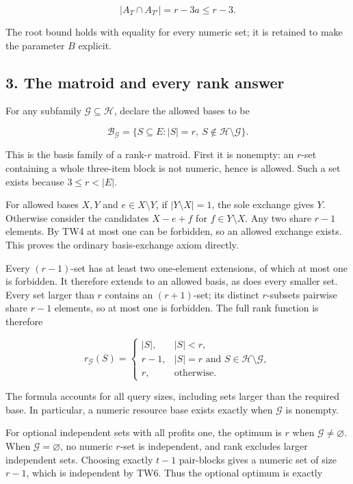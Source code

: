 \[
|A_T\cap A_{T'}|=r-3a\le r-3.
\tag{TW4}
\]

The root bound holds with equality for every numeric set; it is retained to make the parameter \(B\) explicit.

\hypertarget{af-e9b108715f-the-matroid-and-every-rank-answer}{%
\subsection{3. The matroid and every rank answer}\label{af-e9b108715f-the-matroid-and-every-rank-answer}}

For any subfamily \(\mathcal G\subseteq\mathcal H\), declare the allowed bases to be

\[
\mathcal B_{\mathcal G}
=\{S\subseteq E:|S|=r,\ S\notin\mathcal H\setminus\mathcal G\}.
\tag{TW5}
\]

This is the basis family of a rank-\(r\) matroid. First it is nonempty: an \(r\)-set containing a whole three-item block is not numeric, hence is allowed. Such a set exists because \(3\le r<|E|\).

For allowed bases \(X,Y\) and \(e\in X\setminus Y\), if \(|Y\setminus X|=1\), the sole exchange gives \(Y\). Otherwise consider the candidates \(X-e+f\) for \(f\in Y\setminus X\). Any two share \(r-1\) elements. By TW4 at most one can be forbidden, so an allowed exchange exists. This proves the ordinary basis-exchange axiom directly.

Every \((r-1)\)-set has at least two one-element extensions, of which at most one is forbidden. It therefore extends to an allowed basis, as does every smaller set. Every set larger than \(r\) contains an \((r+1)\)-set; its distinct \(r\)-subsets pairwise share \(r-1\) elements, so at most one is forbidden. The full rank function is therefore

\[
r_{\mathcal G}(S)=
\begin{cases}
|S|,&|S|<r,\\
r-1,&|S|=r\text{ and }S\in\mathcal H\setminus\mathcal G,\\
r,&\text{otherwise}.
\end{cases}
\tag{TW6}
\]

The formula accounts for all query sizes, including sets larger than the required base. In particular, a numeric resource base exists exactly when \(\mathcal G\) is nonempty.

For optional independent sets with all profits one, the optimum is \(r\) when \(\mathcal G\ne\varnothing\). When \(\mathcal G=\varnothing\), no numeric \(r\)-set is independent, and rank excludes larger independent sets. Choosing exactly \(t-1\) pair-blocks gives a numeric set of size \(r-1\), which is independent by TW6. Thus the optional optimum is exactly

